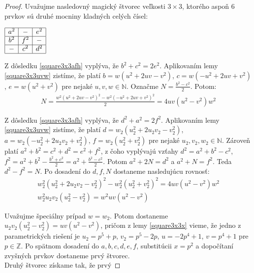 \begin{proof} 
Uvažujme nasledovný magický štvorec veľkosti $3 \times 3$, ktorého aspoň $6$ prvkov sú druhé mocniny kladných celých čísel: \\

\begin{center}
$\begin{array}{ |c|c|c| } 
\hline
a^2 & - & e^2 \\ 
\hline
b^2 & f^2 & - \\ 
\hline
- & c^2 & d^2 \\
\hline
\end{array}$
\end{center}

Z dôsledku \ref{square3x3afh} vyplýva, že $b^2 + c^2 = 2e^2$. Aplikovaním lemy \ref{square3x3uvw} zistíme, že platí $b = w(u^2 + 2uv - v^2)$, $c = w(- u^2 + 2uv + v^2)$, $e = w(u^2 + v^2)$ pre nejaké $u,v,w \in \mathbb{N}$. Označme $N = \frac{b^2 - c^2}{2}$. Potom:
\begin{gather*}
N = \frac{w^2(u^2 + 2uv - v^2)^2 - w^2(- u^2 + 2uv + v^2)^2}{2} = 4uv(u^2 - v^2)w^2
\end{gather*}

Z dôsledku \ref{square3x3afh} vyplýva, že $d^2 + a^2 = 2f^2$. Aplikovaním lemy \ref{square3x3uvw} zistíme, že platí $d = w_2(u_2^2 + 2u_2 v_2 - v_2^2)$, $a = w_2(- u_2^2 + 2u_2 v_2 + v_2^2)$, $f = w_2(u_2^2 + v_2^2)$ pre nejaké $u_2,v_2,w_2 \in \mathbb{N}$. Zároveň platí $a^2 + b^2 = c^2 + d^2 = e^2 + f^2$, z čoho vyplývajú vzťahy $d^2 = a^2 + b^2 - c^2$, $f^2 = a^2 + b^2 - \frac{b^2 + c^2}{2} = a^2 + \frac{b^2 - c^2}{2}$.  Potom $a^2 + 2N = d^2$ a $a^2 + N = f^2$. Teda $d^2 - f^2 = N$. Po dosadení do $d,f,N$ dostaneme nasledujúcu rovnosť:
\begin{gather*}
w_2^2(u_2^2 + 2u_2 v_2 - v_2^2)^2 - w_2^2(u_2^2 + v_2^2)^2 = 4u v(u^2 - v^2)w^2 \\
w_2^2 u_2 v_2 (u_2^2 - v_2^2) = w^2 uv (u^2 - v^2)
\end{gather*}
 
Uvažujme špeciálny prípad $w = w_2$. Potom dostaneme $u_2 v_2 (u_2^2 - v_2^2) = uv (u^2 - v^2)$, pričom z lemy \ref{square3x3x} vieme, že jedno z parametrických riešení je $u_2 = p^5 + p$, $v_2 = p^5 - 2p$, $u = -2p^4 + 1$, $v = p^4 + 1$ pre $p \in \mathbb{Z}$. Po spätnom dosadení do $a,b,c,d,e,f$, substitúcii $x = p^2$ a dopočítaní zvyšných prvkov dostaneme prvý štvorec. \\

Druhý štvorec získame tak, že prvý


\end{proof}
